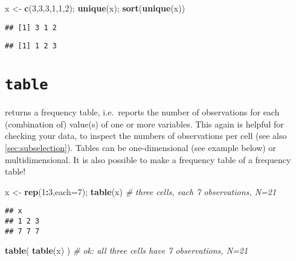 \documentclass[]{book}
\newenvironment{Shaded}{\begin{snugshade}}{\end{snugshade}}
\newcommand{\CommentTok}[1]{\textcolor[rgb]{0.56,0.35,0.01}{\textit{#1}}}
\newcommand{\DataTypeTok}[1]{\textcolor[rgb]{0.13,0.29,0.53}{#1}}
\newcommand{\DecValTok}[1]{\textcolor[rgb]{0.00,0.00,0.81}{#1}}
\newcommand{\KeywordTok}[1]{\textcolor[rgb]{0.13,0.29,0.53}{\textbf{#1}}}
\newcommand{\NormalTok}[1]{#1}
\newcommand{\OperatorTok}[1]{\textcolor[rgb]{0.81,0.36,0.00}{\textbf{#1}}}
\newcommand{\StringTok}[1]{\textcolor[rgb]{0.31,0.60,0.02}{#1}}
\begin{document}
\begin{Shaded}
\begin{Highlighting}[]
\NormalTok{x <-}\StringTok{ }\KeywordTok{c}\NormalTok{(}\DecValTok{3}\NormalTok{,}\DecValTok{3}\NormalTok{,}\DecValTok{3}\NormalTok{,}\DecValTok{1}\NormalTok{,}\DecValTok{1}\NormalTok{,}\DecValTok{2}\NormalTok{); }\KeywordTok{unique}\NormalTok{(x); }\KeywordTok{sort}\NormalTok{(}\KeywordTok{unique}\NormalTok{(x))}
\end{Highlighting}
\end{Shaded}

\begin{verbatim}
## [1] 3 1 2
\end{verbatim}

\begin{verbatim}
## [1] 1 2 3
\end{verbatim}

\hypertarget{table}{%
\section{\texorpdfstring{\texttt{table}}{table}}\label{table}}

returns a frequency table, i.e.~reports the number of observations
for each (combination of) value(s) of one or more variables. This
again is helpful for checking your data, to inspect the numbers of
observations per cell (see also \ref{sec:subselection}).
Tables can be one-dimensional (see
example below) or multidimensional. It is also possible to make a
frequency table of a frequency table!

\begin{Shaded}
\begin{Highlighting}[]
\NormalTok{x <-}\StringTok{ }\KeywordTok{rep}\NormalTok{(}\DecValTok{1}\OperatorTok{:}\DecValTok{3}\NormalTok{,}\DataTypeTok{each=}\DecValTok{7}\NormalTok{); }\KeywordTok{table}\NormalTok{(x) }\CommentTok{# three cells, each 7 observations, N=21}
\end{Highlighting}
\end{Shaded}

\begin{verbatim}
## x
## 1 2 3 
## 7 7 7
\end{verbatim}

\begin{Shaded}
\begin{Highlighting}[]
\KeywordTok{table}\NormalTok{( }\KeywordTok{table}\NormalTok{(x) ) }\CommentTok{# ok: all three cells have 7 observations, N=21}
\end{Highlighting}
\end{Shaded}
\end{document}
